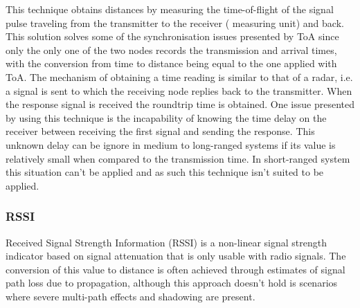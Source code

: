 This technique obtains distances by measuring the time-of-flight of the signal pulse traveling from the transmitter to the receiver ( measuring unit) and back. This solution solves some of the synchronisation issues presented by \ac{ToA} since only the only one of the two nodes records the transmission and arrival times, with the conversion from time to distance being equal to the one applied with \ac{ToA}. The mechanism of obtaining a time reading is similar to that of a radar, i.e. a signal is sent to which the receiving node replies back to the transmitter. When the response signal is received the roundtrip time is obtained. One issue presented by using this technique is the incapability of knowing the time delay on the receiver between receiving the first signal and sending the response. This unknown delay can be ignore in medium to long-ranged systems if its value is relatively small when compared to the transmission time. In short-ranged system this situation can't be applied and as such this technique isn't suited to be applied.


\subsubsection{ \ac{RSSI}}
\label{subsubsec:rssi}

Received Signal Strength Information (RSSI) is a non-linear signal strength indicator based on signal attenuation that is only usable with radio signals. The conversion of this value to distance is often achieved through estimates of signal path loss due to propagation, although this approach doesn't hold is scenarios where severe multi-path effects and shadowing are present.



